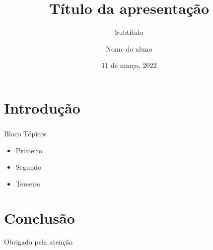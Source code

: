 \documentclass[10pt,xcolor={dvipsnames}]{beamer}
\title{Título da apresentação}
\subtitle{Subtítulo}
\date{11 de março, 2022}
\author{Nome do aluno}
\institute[UFXY]{Instituição de origem}
\begin{document}
\maketitle

\section{Introdução}

\begin{frame}
  \frametitle{\secname}
  
  \begin{block}{Bloco}
    Tópicos
    \begin{itemize}
      \item Primeiro
      \item Segundo
      \item Terceiro
    \end{itemize}
  \end{block}
\end{frame}

\section{Conclusão}

\begin{frame}[standout]
  Obrigado pela atenção
\end{frame}
\end{document}
